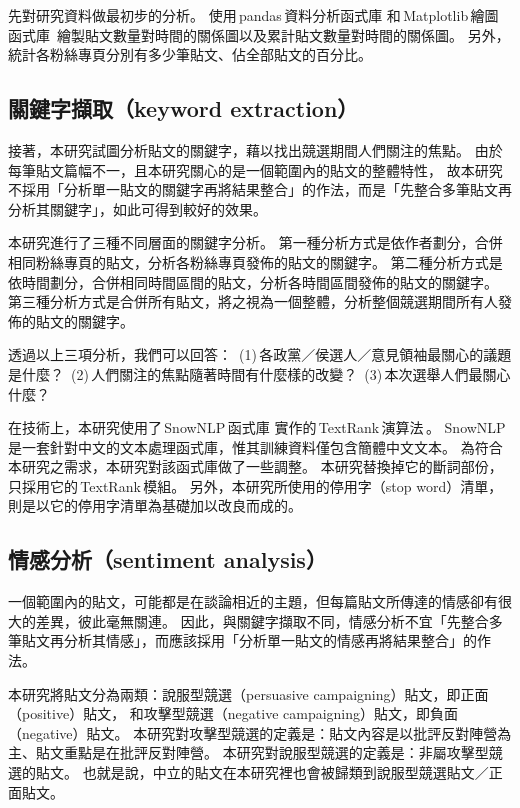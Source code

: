\documentclass[letterpaper, 10pt, conference]{ieeeconf}   %
\begin{document}
\begin{CJK*}{UTF8}{bsmi}
先對研究資料做最初步的分析。
使用\,pandas\,資料分析函式庫\,\cite{c9}\,和\,Matplotlib\,繪圖函式庫\,\cite{c10}
繪製貼文數量對時間的關係圖以及累計貼文數量對時間的關係圖。
另外，統計各粉絲專頁分別有多少筆貼文、佔全部貼文的百分比。

\subsection*{關鍵字擷取（keyword extraction）}

接著，本研究試圖分析貼文的關鍵字，藉以找出競選期間人們關注的焦點。
由於每筆貼文篇幅不一，且本研究關心的是一個範圍內的貼文的整體特性，
故本研究不採用「分析單一貼文的關鍵字再將結果整合」的作法，而是「先整合多筆貼文再分析其關鍵字」，如此可得到較好的效果。

本研究進行了三種不同層面的關鍵字分析。
第一種分析方式是依作者劃分，合併相同粉絲專頁的貼文，分析各粉絲專頁發佈的貼文的關鍵字。
第二種分析方式是依時間劃分，合併相同時間區間的貼文，分析各時間區間發佈的貼文的關鍵字。
第三種分析方式是合併所有貼文，將之視為一個整體，分析整個競選期間所有人發佈的貼文的關鍵字。

透過以上三項分析，我們可以回答：
\,(1)\,各政黨／侯選人／意見領袖最關心的議題是什麼？
\,(2)\,人們關注的焦點隨著時間有什麼樣的改變？
\,(3)\,本次選舉人們最關心什麼？

在技術上，本研究使用了\,SnowNLP\,函式庫\,\cite{c11}\,實作的\,TextRank\,演算法\,\cite{c12}。
SnowNLP\,是一套針對中文的文本處理函式庫，惟其訓練資料僅包含簡體中文文本。
為符合本研究之需求，本研究對該函式庫做了一些調整。
本研究替換掉它的斷詞部份，只採用它的\,TextRank\,模組。
另外，本研究所使用的停用字（stop word）清單，則是以它的停用字清單為基礎加以改良而成的。

\subsection*{情感分析（sentiment analysis）}

一個範圍內的貼文，可能都是在談論相近的主題，但每篇貼文所傳達的情感卻有很大的差異，彼此毫無關連。
因此，與關鍵字擷取不同，情感分析不宜「先整合多筆貼文再分析其情感」，而應該採用「分析單一貼文的情感再將結果整合」的作法。

本研究將貼文分為兩類：說服型競選（persuasive campaigning）貼文，即正面（positive）貼文，
和攻擊型競選（negative campaigning）貼文，即負面（negative）貼文。
本研究對攻擊型競選的定義是：貼文內容是以批評反對陣營為主、貼文重點是在批評反對陣營。
本研究對說服型競選的定義是：非屬攻擊型競選的貼文。
也就是說，中立的貼文在本研究裡也會被歸類到說服型競選貼文／正面貼文。


\end{CJK*}
\end{document}
